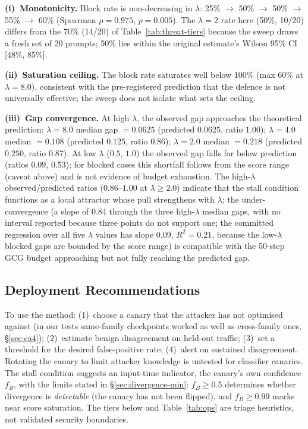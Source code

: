 \documentclass{article}
\begin{document}
\textbf{(i)~Monotonicity.} Block rate is non-decreasing in $\lambda$: 25\% $\to$ 50\% $\to$ 50\% $\to$ 55\% $\to$ 60\% (Spearman $\rho{=}0.975$, $p{=}0.005$). The $\lambda{=}2$ rate here (50\%, 10/20) differs from the 70\% (14/20) of Table~\ref{tab:threat-tiers} because the sweep draws a fresh set of 20 prompts; 50\% lies within the original estimate's Wilson 95\% CI [48\%, 85\%].

\textbf{(ii)~Saturation ceiling.} The block rate saturates well below 100\% (max 60\% at $\lambda{=}8.0$), consistent with the pre-registered prediction that the defence is not universally effective; the sweep does not isolate what sets the ceiling.

\textbf{(iii)~Gap convergence.} At high $\lambda$, the observed gap approaches the theoretical prediction: $\lambda{=}8.0$ median gap $= 0.0625$ (predicted $0.0625$, ratio $1.00$); $\lambda{=}4.0$ median $= 0.108$ (predicted $0.125$, ratio $0.86$); $\lambda{=}2.0$ median $= 0.218$ (predicted $0.250$, ratio $0.87$). At low $\lambda$ ($0.5$, $1.0$) the observed gap falls far below prediction (ratios $0.09$, $0.53$); for blocked cases this shortfall follows from the score range (caveat above) and is not evidence of budget exhaustion. The high-$\lambda$ observed/predicted ratios ($0.86$--$1.00$ at $\lambda \geq 2.0$) indicate that the stall condition functions as a local attractor whose pull strengthens with $\lambda$; the under-convergence (a slope of 0.84 through the three high-$\lambda$ median gaps, with no interval reported because three points do not support one; the committed regression over all five $\lambda$ values has slope 0.09, $R^2 = 0.21$, because the low-$\lambda$ blocked gaps are bounded by the score range) is compatible with the 50-step GCG budget approaching but not fully reaching the predicted gap.

\subsection{Deployment Recommendations}
\label{sec:deployment-recs}

To use the method: (1)~choose a canary that the attacker has not optimised against (in our tests same-family checkpoints worked as well as cross-family ones, \S\ref{sec:ca4}); (2)~estimate benign disagreement on held-out traffic; (3)~set a threshold for the desired false-positive rate; (4)~alert on sustained disagreement. Rotating the canary to limit attacker knowledge is untested for classifier canaries. The stall condition suggests an input-time indicator, the canary's own confidence $f_B$, with the limits stated in \S\ref{sec:divergence-min}: $f_B \geq 0.5$ determines whether divergence is \emph{detectable} (the canary has not been flipped), and $f_B \geq 0.99$ marks near score saturation. The tiers below and Table~\ref{tab:ops} are triage heuristics, not validated security boundaries.
\end{document}
